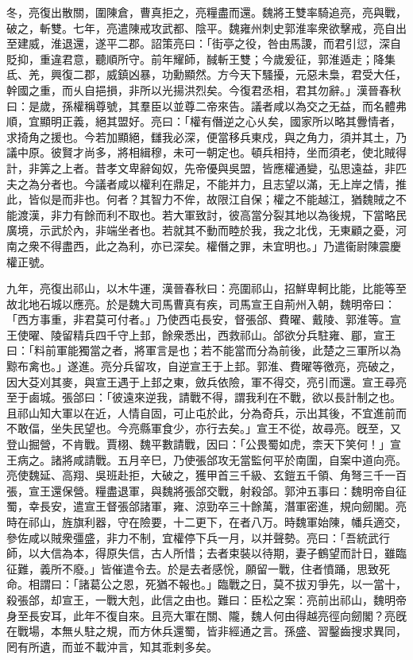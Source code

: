 \begin{pinyinscope}
冬，亮復出散關，圍陳倉，曹真拒之，亮糧盡而還。魏將王雙率騎追亮，亮與戰，破之，斬雙。七年，亮遣陳戒攻武都、陰平。魏雍州刺史郭淮率衆欲擊戒，亮自出至建威，淮退還，遂平二郡。詔策亮曰：「街亭之役，咎由馬謖，而君引愆，深自貶抑，重違君意，聽順所守。前年耀師，馘斬王雙；今歲爰征，郭淮遁走；降集氐、羌，興復二郡，威鎮凶暴，功勳顯然。方今天下騷擾，元惡未梟，君受大任，幹國之重，而乆自挹損，非所以光揚洪烈矣。今復君丞相，君其勿辭。」漢晉春秋曰：是歲，孫權稱尊號，其羣臣以並尊二帝來告。議者咸以為交之无益，而名體弗順，宜顯明正義，絕其盟好。亮曰：「權有僭逆之心乆矣，國家所以略其釁情者，求掎角之援也。今若加顯絕，讎我必深，便當移兵東戍，與之角力，須并其土，乃議中原。彼賢才尚多，將相緝穆，未可一朝定也。頓兵相持，坐而須老，使北賊得計，非筭之上者。昔孝文卑辭匈奴，先帝優與吳盟，皆應權通變，弘思遠益，非匹夫之為分者也。今議者咸以權利在鼎足，不能并力，且志望以滿，无上岸之情，推此，皆似是而非也。何者？其智力不侔，故限江自保；權之不能越江，猶魏賊之不能渡漢，非力有餘而利不取也。若大軍致討，彼高當分裂其地以為後規，下當略民廣境，示武於內，非端坐者也。若就其不動而睦於我，我之北伐，无東顧之憂，河南之衆不得盡西，此之為利，亦已深矣。權僭之罪，未宜明也。」乃遣衞尉陳震慶權正號。

九年，亮復出祁山，以木牛運，漢晉春秋曰：亮圍祁山，招鮮卑軻比能，比能等至故北地石城以應亮。於是魏大司馬曹真有疾，司馬宣王自荊州入朝，魏明帝曰：「西方事重，非君莫可付者。」乃使西屯長安，督張郃、費曜、戴陵、郭淮等。宣王使曜、陵留精兵四千守上邽，餘衆悉出，西救祁山。郃欲分兵駐雍、郿，宣王曰：「料前軍能獨當之者，將軍言是也；若不能當而分為前後，此楚之三軍所以為黥布禽也。」遂進。亮分兵留攻，自逆宣王于上邽。郭淮、費曜等徼亮，亮破之，因大芟刈其麥，與宣王遇于上邽之東，斂兵依險，軍不得交，亮引而還。宣王尋亮至于鹵城。張郃曰：「彼遠來逆我，請戰不得，謂我利在不戰，欲以長計制之也。且祁山知大軍以在近，人情自固，可止屯於此，分為奇兵，示出其後，不宜進前而不敢偪，坐失民望也。今亮縣軍食少，亦行去矣。」宣王不從，故尋亮。旣至，又登山掘營，不肯戰。賈栩、魏平數請戰，因曰：「公畏蜀如虎，柰天下笑何！」宣王病之。諸將咸請戰。五月辛巳，乃使張郃攻无當監何平於南圍，自案中道向亮。亮使魏延、高翔、吳班赴拒，大破之，獲甲首三千級、玄鎧五千領、角弩三千一百張，宣王還保營。糧盡退軍，與魏將張郃交戰，射殺郃。郭沖五事曰：魏明帝自征蜀，幸長安，遣宣王督張郃諸軍，雍、涼勁卒三十餘萬，潛軍密進，規向劒閣。亮時在祁山，旌旗利器，守在險要，十二更下，在者八万。時魏軍始陳，幡兵適交，參佐咸以賊衆彊盛，非力不制，宜權停下兵一月，以并聲勢。亮曰：「吾統武行師，以大信為本，得原失信，古人所惜；去者束裝以待期，妻子鶴望而計日，雖臨征難，義所不廢。」皆催遣令去。於是去者感恱，願留一戰，住者憤踊，思致死命。相謂曰：「諸葛公之恩，死猶不報也。」臨戰之日，莫不拔刃爭先，以一當十，殺張郃，却宣王，一戰大剋，此信之由也。難曰：臣松之案：亮前出祁山，魏明帝身至長安耳，此年不復自來。且亮大軍在關、隴，魏人何由得越亮徑向劒閣？亮旣在戰場，本無乆駐之規，而方休兵還蜀，皆非經通之言。孫盛、習鑿齒搜求異同，罔有所遺，而並不載沖言，知其乖剌多矣。


\end{pinyinscope}
